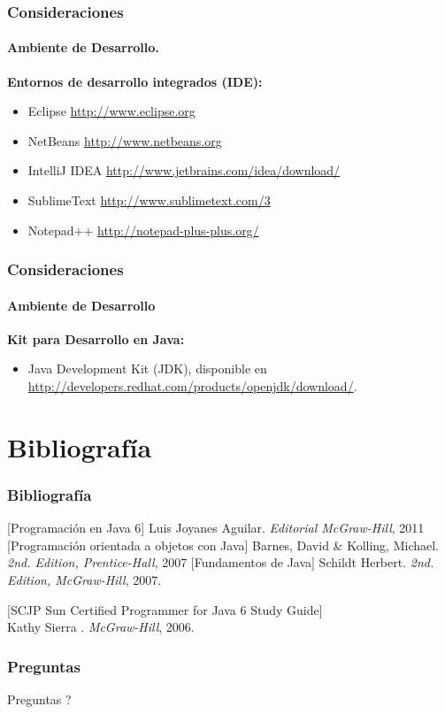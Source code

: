 \documentclass{beamer}
\begin{document}
		\begin{frame}
			\frametitle{Consideraciones}
			\framesubtitle{Ambiente de Desarrollo.}

			\textbf{Entornos de desarrollo integrados (IDE):}

			\begin{itemize}
				\item Eclipse  \url{http://www.eclipse.org}
				\item NetBeans \url{http://www.netbeans.org}
				\item IntelliJ IDEA  \url{http://www.jetbrains.com/idea/download/}
				\item SublimeText   \url{http://www.sublimetext.com/3}
				\item Notepad++  \url{http://notepad-plus-plus.org/}
			\end{itemize}

		\end{frame}

		\begin{frame}
			\frametitle{Consideraciones}
			\framesubtitle{Ambiente de Desarrollo}

			\textbf{Kit para Desarrollo en Java:}

			\begin{itemize}
				\item Java Development Kit (JDK), disponible en \url{http://developers.redhat.com/products/openjdk/download/}.
			\end{itemize}
		\end{frame}

	\section{Bibliograf\'ia}

		\begin{frame}
			\frametitle{Bibliograf\'ia}

			\begin{thebibliography}{10}
				\beamertemplatebookbibitems
				[Programaci\'on en Java 6] Luis Joyanes Aguilar. \newblock \emph{Editorial McGraw-Hill}, 2011
				[Programaci\'on orientada a objetos con Java] Barnes, David \& Kolling, Michael. \newblock \emph{2nd. Edition, Prentice-Hall}, 2007
				[Fundamentos de Java] Schildt Herbert. \newblock \emph{2nd. Edition, McGraw-Hill}, 2007.

[SCJP Sun Certified Programmer for Java 6 Study Guide]\\ Kathy Sierra . \newblock \emph{ McGraw-Hill}, 2006.
			\end{thebibliography}
		\end{frame}

		\begin{frame}
			\frametitle{Preguntas}

			\hspace{4cm}\huge{Preguntas ?}

		\end{frame}
	
\end{document}
